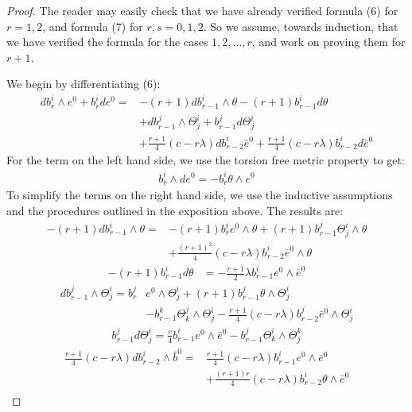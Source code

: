 \begin{proof}  The reader may easily check that we have already verified formula (6) for $r=1,2$, and formula (7) for $r,s = 0,1,2$.  So we assume, towards induction, that we have verified the formula for the cases $1,2,\ldots,r$, and work on proving them for $r+1$.  

We begin by differentiating (6):
%
\begin{align*}
d b^i_r \wedge e^0 + b^i_r d e^0 = &-(r+1) d b^i_{r-1} \wedge \theta - (r+1) b^i_{r-1} d \theta \\
&+ d b^j_{r-1} \wedge \Theta^i_j + b^j_{r-1} d \Theta^i_j \\
&+ \frac{r+1}{4} (c - r \lambda) d b^i_{r-2} \bar{e}^0 + \frac{r+1}{4} (c - r \lambda) b^i_{r - 2} d \bar{e}^0
\end{align*} 
%
For the term on the left hand side, we use the torsion free metric property to get:
%
\begin{align*}
b^i_r \wedge d e^0 = - b^i_r \theta \wedge e^0
\end{align*}
%
To simplify the terms on the right hand side, we use the inductive assumptions and the procedures outlined in the exposition above.  The results are:
%
\begin{align*}
-(r+1) d b^i_{r-1} \wedge \theta = &-(r+1) b^i_r e^0 \wedge \theta + (r+1) b^j_{r-1} \Theta^i_j \wedge \theta  \\
&+ \frac{(r+1)^2}{4} (c - r \lambda) b^i_{r-2} \bar{e}^0 \wedge \theta 
\end{align*}
%
\begin{align*}
- (r+1) b^i_{r-1} d \theta &= - \frac{r+1}{2} \lambda b^i_{r-1} e^0 \wedge \bar{e}^0
\end{align*}
%
\begin{align*}
d b^j_{r-1} \wedge \Theta^i_j = b^j_{r} &e^0 \wedge \Theta^i_j + (r+1) b^j_{r-1} \theta \wedge \Theta^i_j \\
&- b^k_{r-1} \Theta^j_k \wedge \Theta^i_j - \frac{r+1}{4}(c - r \lambda) b^j_{r-2} \bar{e}^0 \wedge \Theta^i_j
\end{align*}
%
\begin{align*}
b^j_{r-1} d \Theta^i_j = \frac{c}{4} b^i_{r-1} e^0 \wedge \bar{e}^0 - b^j_{r-1} \Theta^i_k \wedge \Theta^k_j
\end{align*}
%
\begin{align*}
\frac{r+1}{4}(c-r \lambda) d b^i_{r-2} \wedge \bar{b}^0 = &\frac{r+1}{4} (c - r \lambda) b^i_{r-1} e^0 \wedge \bar{e}^0 \\
&+ \frac{ (r+1)r }{4}( c - r \lambda) b^i_{r-2} \theta \wedge \bar{e}^0 \\

\end{align*}
\end{proof}
